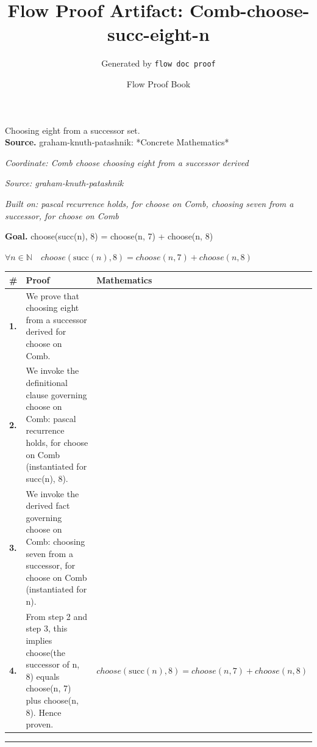 \documentclass[11pt]{article}
\title{Flow Proof Artifact: Comb-choose-succ-eight-n}
\author{Generated by \texttt{flow doc proof}}
\date{Flow Proof Book}
\theoremstyle{definition}
\begin{document}
\maketitle
Choosing eight from a successor set.\\[0.5em]
\textbf{Source.} graham-knuth-patashnik: *Concrete Mathematics*\\[0.5em]
\bigskip
{}\par
\smallskip\noindent\textit{Coordinate: Comb \cdot choose \cdot choosing eight from a successor derived}\par
\smallskip\noindent\textit{Source: graham-knuth-patashnik}\par
\smallskip\noindent\textit{Built on: pascal recurrence holds, for choose on Comb, choosing seven from a successor, for choose on Comb}\par
\medskip
\noindent\textbf{Goal.} choose(succ(n), 8) = choose(n, 7) + choose(n, 8)\par
\noindent$\displaystyle \forall n \in \mathbb{N}\quad choose(\mathrm{succ}(n), 8) = choose(n, 7) + choose(n, 8)$\par
\medskip
\noindent
\begin{tabular}{@{} >{\raggedright\arraybackslash}p{} >{\raggedright\arraybackslash}p{} >{\raggedleft\arraybackslash}p{} @{}}
\textbf{\#} & \textbf{Proof} & \textbf{Mathematics} \\
\midrule
\textbf{1.} & We prove that choosing eight from a successor derived for choose on Comb. & \\[0.45em]
\textbf{2.} & We invoke the definitional clause governing choose on Comb: pascal recurrence holds, for choose on Comb (instantiated for succ(n), 8). & \\[0.45em]
\textbf{3.} & We invoke the derived fact governing choose on Comb: choosing seven from a successor, for choose on Comb (instantiated for n). & \\[0.45em]
\textbf{4.} & From step 2 and step 3, this implies choose(the successor of n, 8) equals choose(n, 7) plus choose(n, 8). Hence proven. & $\displaystyle choose(\mathrm{succ}(n), 8) = choose(n, 7) + choose(n, 8)$ \\[0.45em]
\bottomrule
\end{tabular}
\label{thm:Comb-choose-choosing_eight_from_a_successor_derived}
\par\medskip\hrule
\end{document}
